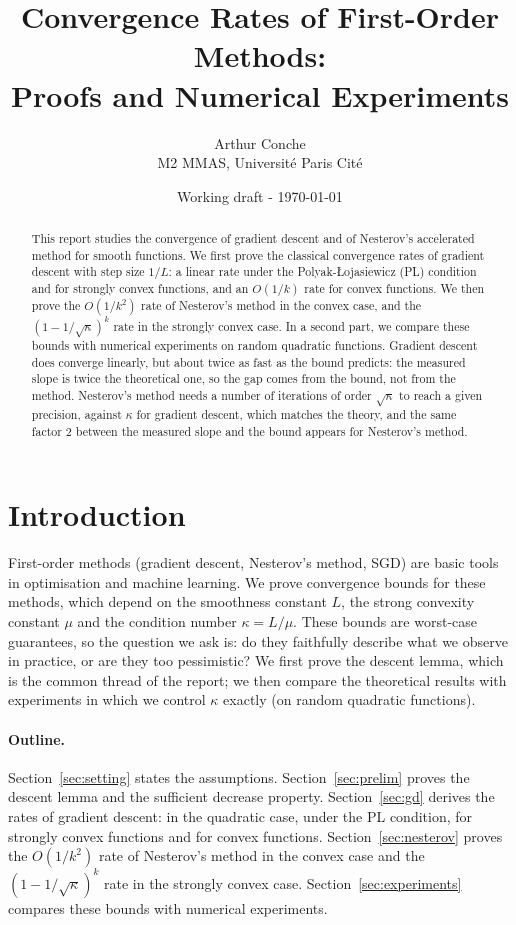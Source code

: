 \documentclass[11pt,a4paper]{article}
\title{Convergence Rates of First-Order Methods:\\ Proofs and Numerical Experiments}
\author{Arthur Conche\\ M2 MMAS, Universit\'e Paris Cit\'e}
\date{Working draft - \today}
\theoremstyle{definition}
\theoremstyle{remark}
\begin{document}
\maketitle

\begin{abstract}
This report studies the convergence of gradient descent and of Nesterov's accelerated method for smooth functions. We first prove the classical convergence rates of gradient descent
with step size $1/L$: a linear rate under the Polyak-{\L}ojasiewicz (PL) condition and for strongly convex functions, and an $O(1/k)$ rate for convex functions. We then prove the $O(1/k^2)$ rate of Nesterov's 
method in the convex case, and the $(1-1/\sqrt\kappa)^k$ rate in the strongly convex case. In a second part, we compare these bounds with numerical experiments on random quadratic functions. Gradient descent does converge linearly, but about twice as fast
as the bound predicts: the measured slope is twice the theoretical one, so the gap comes from the bound, not from the method. Nesterov's method needs a number of iterations of order $\sqrt{\kappa}$ to reach a given precision, against $\kappa$ for gradient descent, which matches the theory, and the same factor $2$ between the measured slope and the bound appears for Nesterov's method.
\end{abstract}
\section{Introduction}
First-order methods (gradient descent, Nesterov's method, SGD) are basic tools in optimisation and machine learning. We prove convergence bounds for these methods, which depend on the smoothness constant $L$, the strong convexity constant $\mu$ and the condition number $\kappa = L/\mu$.
These bounds are worst-case guarantees, so the question we ask is: do they faithfully describe what we observe in practice, or are they too pessimistic?
We first prove the descent lemma, which is the common thread of the report; we then compare the theoretical results with experiments in which we control $\kappa$ exactly (on random quadratic functions).

\paragraph{Outline.} Section~\ref{sec:setting} states the assumptions. Section~\ref{sec:prelim} proves the descent lemma and the sufficient decrease property. Section~\ref{sec:gd} derives the rates of gradient descent: in the quadratic case, under the PL condition, for strongly convex functions and for convex functions. Section~\ref{sec:nesterov} proves the $O(1/k^2)$ rate of Nesterov's method in the convex case and the $(1-1/\sqrt\kappa)^k$ rate in the strongly convex case. Section~\ref{sec:experiments} compares these bounds with numerical experiments.
\end{document}
